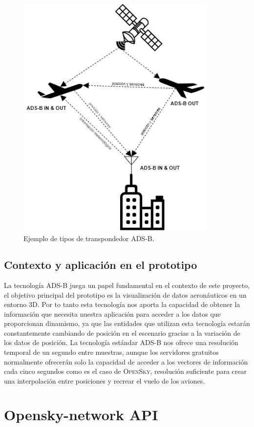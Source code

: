 \documentclass[a4paper, 11pt]{book}
\begin{document}
\begin{figure}[h]
	\centering
	\includegraphics[width=10cm, keepaspectratio]{img/adsbtypes.drawio.png}
	\caption{Ejemplo de tipos de transpondedor ADS-B.}
	\label{fig:adsbtypes}
\end{figure}
\subsection{Contexto y aplicación en el prototipo}
La tecnología \textsc{ADS-B} juega un papel fundamental en el contexto de este proyecto, el objetivo principal del prototipo es la visualización de datos aeronáuticos en un entorno \textsc{\gls{3D}}. Por to tanto esta tecnología nos aporta la capacidad de obtener la información que necesita nuestra aplicación para acceder a los datos que proporcionan dinamismo, ya que las entidades que utilizan esta tecnología estarán constantemente cambiando de posición en el escenario gracias a la variación de los datos de posición.
La tecnología estándar \textsc{ADS-B} nos ofrece una resolución temporal de un segundo entre muestras, aunque los servidores gratuitos normalmente ofrecerán solo la capacidad de acceder a los vectores de información cada cinco segundos como es el caso de \textsc{OpenSky}, resolución suficiente para crear una interpolación entre posiciones y recrear el vuelo de los aviones.
\section{Opensky-network API}
\label{sec:opensky}
\end{document}
